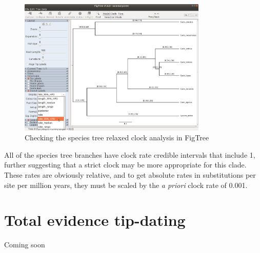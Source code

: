 \documentclass[12pt]{article}
\begin{document}
\begin{figure}[htb!]
\centering
\includegraphics[width=0.8\textwidth]{figures/figtreeUCLN.png}
\caption
{Checking the species tree relaxed clock analysis in FigTree}
\label{fig:figtreeUCLN}
\end{figure}

All of the species tree branches have clock rate credible intervals
that include 1, further suggesting that a strict clock may be more
appropriate for this clade. These rates are obviously relative, and
to get absolute rates in substitutions per site per million years,
they must be scaled by the \textit{a priori} clock rate of 0.001.

\section{Total evidence tip-dating}
\label{sec:FBD}

Coming soon



\end{document}
